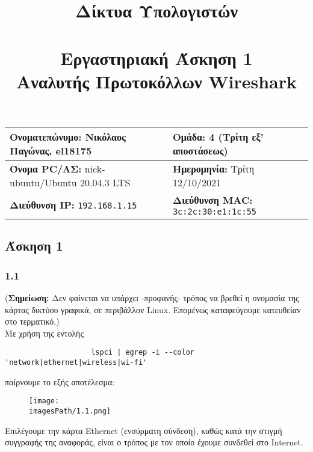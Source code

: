 

\newcommand{\imagesPath}{images}

\title{\textbf{Δίκτυα Υπολογιστών} \\~\\Εργαστηριακή Άσκηση 1 \\ Αναλυτής Πρωτοκόλλων Wireshark}
\author{}
\date{}


	\maketitle
	
	\begin{tabular}{|l|l|}
		\hline
		\textbf{Ονοματεπώνυμο:} Νικόλαος Παγώνας, el18175 & \textbf{Ομάδα:} 4 (Τρίτη εξ' αποστάσεως) \\
		\hline
		\textbf{Όνομα PC/ΛΣ:} nick-ubuntu/Ubuntu 20.04.3 LTS & \textbf{Ημερομηνία:} Τρίτη 12/10/2021  \\
		\hline
		\textbf{Διεύθυνση IP:} \verb|192.168.1.15| & \textbf{Διεύθυνση MAC:} \verb|3c:2c:30:e1:1c:55|\\
		\hline
	\end{tabular}
	
	\subsection*{Άσκηση 1}
	
		\subsubsection*{1.1}
		
		(\textbf{Σημείωση:} Δεν φαίνεται να υπάρχει -προφανής- τρόπος να βρεθεί η ονομασία της κάρτας δικτύου γραφικά, σε περιβάλλον Linux. Επομένως καταφεύγουμε κατευθείαν στο τερματικό.) \\
		
			Με χρήση της εντολής 
				\begin{verbatim}
					lspci | egrep -i --color 'network|ethernet|wireless|wi-fi'
				\end{verbatim}
				
			παίρνουμε το εξής αποτέλεσμα: 
			
			\begin{figure}[H]
				\texttt{[image: \\imagesPath/1.1.png]}	
			\end{figure}
			
			Επιλέγουμε την κάρτα Ethernet (ενσύρματη σύνδεση), καθώς κατά την στιγμή συγγραφής της αναφοράς, είναι ο τρόπος με τον οποίο έχουμε συνδεθεί στο Internet.
		
